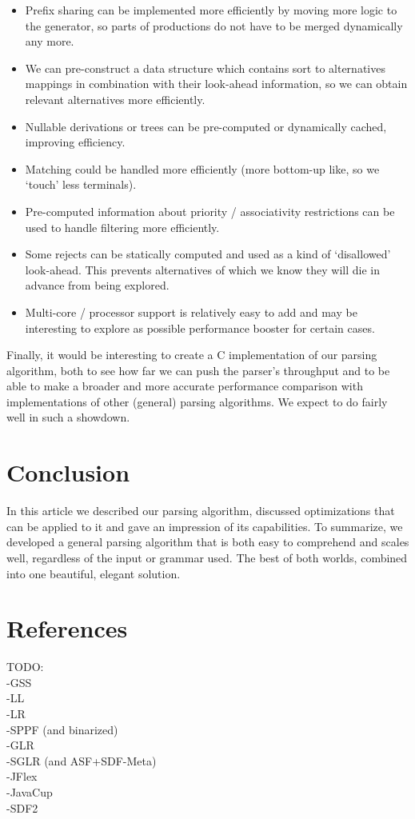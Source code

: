 \documentclass[a4paper,10pt]{article}
\begin{document}
\begin{itemize}
 \setlength{\itemsep}{0pt}
 \setlength{\parskip}{0pt}
 \setlength{\parsep}{0pt}
 
 \item Prefix sharing can be implemented more efficiently by moving more logic to the generator, so parts of productions do not have to be merged dynamically any more.
 \item We can pre-construct a data structure which contains sort to alternatives mappings in combination with their look-ahead information, so we can obtain relevant alternatives more efficiently.
 \item Nullable derivations or trees can be pre-computed or dynamically cached, improving efficiency.
 \item Matching could be handled more efficiently (more bottom-up like, so we `touch' less terminals).
 \item Pre-computed information about priority / associativity restrictions can be used to handle filtering more efficiently.
 \item Some rejects can be statically computed and used as a kind of `disallowed' look-ahead. This prevents alternatives of which we know they will die in advance from being explored.
 \item Multi-core / processor support is relatively easy to add and may be interesting to explore as possible performance booster for certain cases.
\end{itemize}

Finally, it would be interesting to create a C implementation of our parsing algorithm, both to see how far we can push the parser's throughput and to be able to make a broader and more accurate performance comparison with implementations of other (general) parsing algorithms. We expect to do fairly well in such a showdown.

\section{Conclusion}

In this article we described our parsing algorithm, discussed optimizations that can be applied to it and gave an impression of its capabilities. To summarize, we developed a general parsing algorithm that is both easy to comprehend and scales well, regardless of the input or grammar used. The best of both worlds, combined into one beautiful, elegant solution.

\section{References}

TODO:\\
-GSS\\
-LL\\
-LR\\
-SPPF (and binarized)\\
-GLR\\
-SGLR (and ASF+SDF-Meta)\\
-JFlex\\
-JavaCup\\
-SDF2
\end{document}
